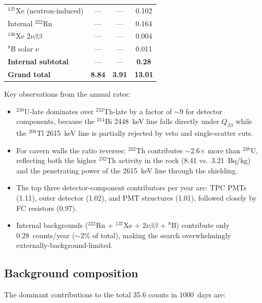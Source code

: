 \documentclass[11pt]{article}
\begin{document}
\begin{table}[h]
\begin{tabular}{@{}lS[table-format=1.3]S[table-format=1.3]S[table-format=1.3]@{}}
\midrule
$^{137}$Xe (neutron-induced) & {---} & {---} & 0.102 \\
Internal $^{222}$Rn          & {---} & {---} & 0.164 \\
$^{136}$Xe $2\nu\beta\beta$  & {---} & {---} & 0.004 \\
$^{8}$B solar $\nu$          & {---} & {---} & 0.011 \\
\midrule
\textbf{Internal subtotal}   & {---} & {---} & \textbf{0.28} \\
\midrule[\heavyrulewidth]
\textbf{Grand total}         & \textbf{8.84} & \textbf{3.91} & \textbf{13.01} \\
\bottomrule
\end{tabular}
\end{table}

Key observations from the annual rates:
\begin{itemize}
\item $^{238}$U-late dominates over $^{232}$Th-late by a factor of
  $\sim$9 for detector components, because the $^{214}$Bi 2448~keV
  line falls directly under $Q_{\beta\beta}$ while the $^{208}$Tl
  2615~keV line is partially rejected by veto and single-scatter cuts.

\item For cavern walls the ratio reverses: $^{232}$Th contributes
  $\sim$2.6$\times$ more than $^{238}$U, reflecting both the higher
  $^{232}$Th activity in the rock (8.41 vs.\ 3.21~Bq/kg) and the
  penetrating power of the 2615~keV line through the shielding.

\item The top three detector-component contributors per year are:
  TPC PMTs (1.11), outer detector (1.02), and PMT structures (1.01),
  followed closely by FC resistors (0.97).

\item Internal backgrounds ($^{222}$Rn + $^{137}$Xe +
  $2\nu\beta\beta$ + $^{8}$B) contribute only 0.28~counts/year
  ($\sim$2\% of total), making the search overwhelmingly
  externally-background-limited.
\end{itemize}

\subsection{Background composition}

The dominant contributions to the total 35.6 counts in 1000~days are:
\end{document}
